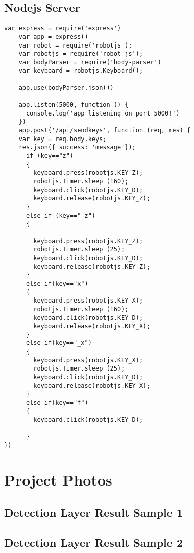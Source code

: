 \documentclass[onecolumn, draftclsnofoot,10pt, compsoc]{IEEEtran}
\begin{document}
\subsection{Nodejs Server}
\begin{lstlisting}[language=VBScript,caption=Nodejs script runs a server and listen for client request to execute keyboard commands.]
	var express = require('express')
	var app = express()
	var robot = require('robotjs');
	var robotjs = require('robot-js');
	var bodyParser = require('body-parser')
	var keyboard = robotjs.Keyboard();

	app.use(bodyParser.json())

	app.listen(5000, function () {
	  console.log('app listening on port 5000!')
	})
	app.post('/api/sendkeys', function (req, res) {
	var key = req.body.keys;
	res.json({ success: 'message'});
	  if (key=="z")
	  {
	    keyboard.press(robotjs.KEY_Z);
	    robotjs.Timer.sleep (160);
	    keyboard.click(robotjs.KEY_D);
	    keyboard.release(robotjs.KEY_Z);
	  }
	  else if (key=="_z")
	  {

	    keyboard.press(robotjs.KEY_Z);
	    robotjs.Timer.sleep (25);
	    keyboard.click(robotjs.KEY_D);
	    keyboard.release(robotjs.KEY_Z);
	  }
	  else if(key=="x")
	  {
	    keyboard.press(robotjs.KEY_X);
	    robotjs.Timer.sleep (160);
	    keyboard.click(robotjs.KEY_D);
	    keyboard.release(robotjs.KEY_X);
	  }
	  else if(key=="_x")
	  {
	    keyboard.press(robotjs.KEY_X);
	    robotjs.Timer.sleep (25);
	    keyboard.click(robotjs.KEY_D);
	    keyboard.release(robotjs.KEY_X);
	  }
	  else if(key=="f")
	  {
	    keyboard.click(robotjs.KEY_D);

	  }
})
\end{lstlisting}
\section{Project Photos}
\subsection{Detection Layer Result Sample 1}
\begin{center}
\end{center}
\subsection{Detection Layer Result Sample 2}
\begin{center}
\end{center}
\end{document}

